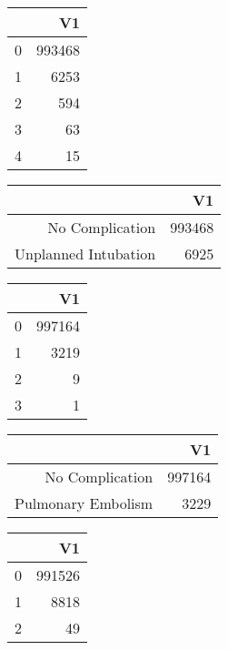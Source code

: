 \bigskip\bigskip
\centering
\begin{tabular}{rr}
  \hline
 & V1 \\ 
  \hline
0 & 993468 \\ 
  1 & 6253 \\ 
  2 & 594 \\ 
  3 &  63 \\ 
  4 &  15 \\ 
   \hline
\end{tabular}

\bigskip\bigskip
\centering
\begin{tabular}{rr}
  \hline
 & V1 \\ 
  \hline
No Complication & 993468 \\ 
  Unplanned Intubation & 6925 \\ 
   \hline
\end{tabular}

\bigskip\bigskip
\centering
\begin{tabular}{rr}
  \hline
 & V1 \\ 
  \hline
0 & 997164 \\ 
  1 & 3219 \\ 
  2 &   9 \\ 
  3 &   1 \\ 
   \hline
\end{tabular}

\bigskip\bigskip
\centering
\begin{tabular}{rr}
  \hline
 & V1 \\ 
  \hline
No Complication & 997164 \\ 
  Pulmonary Embolism & 3229 \\ 
   \hline
\end{tabular}

\bigskip\bigskip
\centering
\begin{tabular}{rr}
  \hline
 & V1 \\ 
  \hline
0 & 991526 \\ 
  1 & 8818 \\ 
  2 &  49 \\ 
   \hline
\end{tabular}

